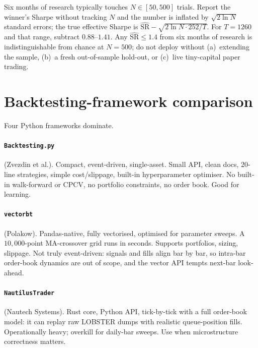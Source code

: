 \begin{pitfallbox}
Six months of research typically touches $N \in [50, 500]$ trials.
Report the winner's Sharpe without tracking $N$ and the number is
inflated by $\sqrt{2 \ln N}$ standard errors; the true effective
Sharpe is $\widehat{\text{SR}} - \sqrt{2 \ln N \cdot 252 / T}$. For
$T = 1260$ and that range, subtract $0.88$--$1.41$. Any
$\widehat{\text{SR}} \leq 1.4$ from six months of research is
indistinguishable from chance at $N = 500$; do not deploy without
(a)~extending the sample, (b)~a fresh out-of-sample hold-out, or
(c)~live tiny-capital paper trading.
\end{pitfallbox}

\section{Backtesting-framework comparison}
\label{sec:bt_frameworks}

Four Python frameworks dominate.

\paragraph{\texttt{Backtesting.py}} (Zvezdin et al.). Compact,
event-driven, single-asset. Small API, clean docs, $20$-line
strategies, simple cost/slippage, built-in hyperparameter
optimiser. No built-in walk-forward or CPCV, no portfolio
constraints, no order book. Good for learning.

\paragraph{\texttt{vectorbt}} (Polakow). Pandas-native, fully
vectorised, optimised for parameter sweeps. A $10{,}000$-point
MA-crossover grid runs in seconds. Supports portfolios, sizing,
slippage. Not truly event-driven: signals and fills align bar by
bar, so intra-bar order-book dynamics are out of scope, and the
vector API tempts next-bar look-ahead.

\paragraph{\texttt{NautilusTrader}} (Nautech Systems). Rust core,
Python API, tick-by-tick with a full order-book model: it can
replay raw LOBSTER dumps with realistic queue-position fills.
Operationally heavy; overkill for daily-bar sweeps. Use when
microstructure correctness matters.


